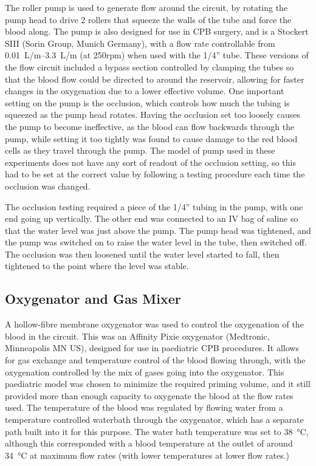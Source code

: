 The roller pump is used to generate flow around the circuit, by rotating the pump head to drive 2 rollers that squeeze the walls of the tube and force the blood along.
The pump is also designed for use in CPB surgery, and is a Stockert SIII (Sorin Group, Munich Germany), with a flow rate controllable from \SIrange{0.01}{3.3}{L/m} (at 250rpm) when used with the 1/4'' tube.
These versions of the flow circuit included a bypass section controlled by clamping the tubes so that the blood flow could be directed to around the reservoir, allowing for faster changes in the oxygenation due to a lower effective volume.
One important setting on the pump is the occlusion, which controls how much the tubing is squeezed as the pump head rotates.
Having the occlusion set too loosely causes the pump to become ineffective, as the blood can flow backwards through the pump, while setting it too tightly was found to cause damage to the red blood cells as they travel through the pump.
The model of pump used in these experiments does not have any sort of readout of the occlusion setting, so this had to be set at the correct value by following a testing procedure each time the occlusion was changed.

The occlusion testing required a piece of the 1/4'' tubing in the pump, with one end going up vertically.
The other end was connected to an IV bag of saline so that the water level was just above the pump.
The pump head was tightened, and the pump was switched on to raise the water level in the tube, then switched off.
The occlusion was then loosened until the water level started to fall, then tightened to the point where the level was stable.

\subsection{Oxygenator and Gas Mixer}
A hollow-fibre membrane oxygenator was used to control the oxygenation of the blood in the circuit.
This was an Affinity Pixie oxygenator (Medtronic, Minneapolis MN US), designed for use in paediatric CPB procedures.
It allows for gas exchange and temperature control of the blood flowing through, with the oxygenation controlled by the mix of gases going into the oxygenator.
This paediatric model was chosen to minimize the required priming volume, and it still provided more than enough capacity to oxygenate the blood at the flow rates used.
The temperature of the blood was regulated by flowing water from a temperature controlled waterbath through the oxygenator, which has a separate path built into it for this purpose.
The water bath temperature was set to \SI{38}{\degreeCelsius}, although this corresponded with a blood temperature at the outlet of around \SI{34}{\degreeCelsius} at maximum flow rates (with lower temperatures at lower flow rates.)

